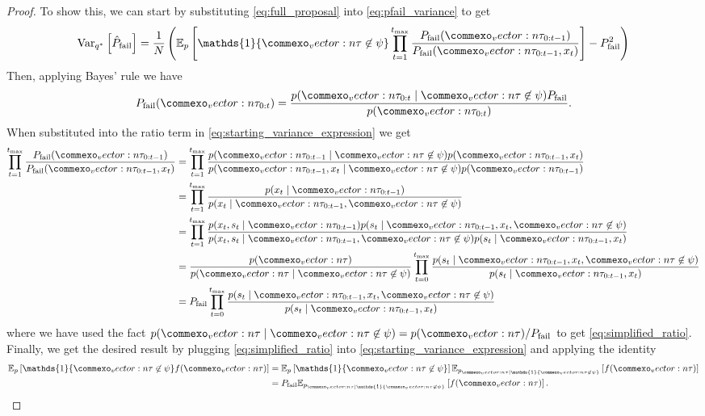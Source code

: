 \begin{proof}
To show this, we can start by substituting \cref{eq:full_proposal} into \cref{eq:pfail_variance} to get
\begin{equation}
    \text{Var}_{q^*}\left[ \hat{P}_{\rm fail} \right] = \frac{1}{N} \left(\mathbb{E}_p \left[\mathds{1}\{ \vec{\tau} \not \in \psi \} \prod_{t=1}^{t_{\rm max}} \frac{P_{\rm fail}(\vec{\tau}_{0:t-1})}{P_{\rm fail}(\vec{\tau}_{0:t-1}, x_t)} \right] - P_{\rm fail}^2 \right) \label{eq:starting_variance_expression}
\end{equation}
Then, applying Bayes' rule we have 
\begin{equation}
    P_{\rm fail}(\vec{\tau}_{0:t}) = \frac{p(\vec{\tau}_{0:t} \mid \vec{\tau} \not \in \psi) P_{\rm fail}}{p(\vec{\tau}_{0:t})} \text{.}
\end{equation}
When substituted into the ratio term in \cref{eq:starting_variance_expression} we get
\begin{align}
    \prod_{t=1}^{t_{\rm max}} \frac{P_{\rm fail}(\vec{\tau}_{0:t-1})}{P_{\rm fail}(\vec{\tau}_{0:t-1}, x_t)} &= \prod_{t=1}^{t_{\rm max}} \frac{p(\vec{\tau}_{0:t-1} \mid \vec{\tau} \not \in \psi ) p(\vec{\tau}_{0:t-1}, x_t)}{p(\vec{\tau}_{0:t-1}, x_t \mid \vec{\tau} \not \in \psi ) p(\vec{\tau}_{0:t-1})} \\
    &= \prod_{t=1}^{t_{\rm max}} \frac{p(x_t \mid \vec{\tau}_{0:t-1})}{p(x_t \mid \vec{\tau}_{0:t-1}, \vec{\tau} \not \in \psi )} \\
    &= \prod_{t=1}^{t_{\rm max}} \frac{p(x_t, s_t \mid \vec{\tau}_{0:t-1})p(s_t \mid \vec{\tau}_{0:t-1}, x_t, \vec{\tau} \not \in \psi )}{p(x_t, s_t \mid \vec{\tau}_{0:t-1}, \vec{\tau} \not \in \psi )p(s_t \mid \vec{\tau}_{0:t-1}, x_t)} \\
    &= \frac{p(\vec{\tau})}{p(\vec{\tau} \mid \vec{\tau} \not \in \psi )} \prod_{t=0}^{t_{\rm max}} \frac{p(s_t \mid \vec{\tau}_{0:t-1}, x_t, \vec{\tau} \not \in \psi )}{p(s_t \mid \vec{\tau}_{0:t-1}, x_t)} \\
    &= P_{\rm fail}\prod_{t=0}^{t_{\rm max}} \frac{p(s_t \mid \vec{\tau}_{0:t-1}, x_t, \vec{\tau} \not \in \psi )}{p(s_t \mid \vec{\tau}_{0:t-1}, x_t)} \label{eq:simplified_ratio}
\end{align}
where we have used the fact $p(\vec{\tau} \mid \vec{\tau} \not \in \psi ) =  p (\vec{\tau})/P_{\rm fail}$ to get \cref{eq:simplified_ratio}. Finally, we get the desired result by plugging \cref{eq:simplified_ratio} into \cref{eq:starting_variance_expression} and applying the identity
\begin{align}
    \mathbb{E}_p \left[ \mathds{1} \{\vec{\tau} \not \in \psi\} f(\vec{\tau}) \right] &= \mathbb{E}_p \left[ \mathds{1} \{\vec{\tau} \not \in \psi\} \right] \mathbb{E}_{p_{\vec{\tau} \mid \mathds{1} \{\vec{\tau} \not \in \psi\}}}  \left[ f(\vec{\tau}) \right]  \\
    &= P_{\rm fail} \mathbb{E}_{p_{\vec{\tau} \mid \mathds{1} \{\vec{\tau} \not \in \psi\}}}  \left[ f(\vec{\tau}) \right]\text{.}
\end{align}
\end{proof}

